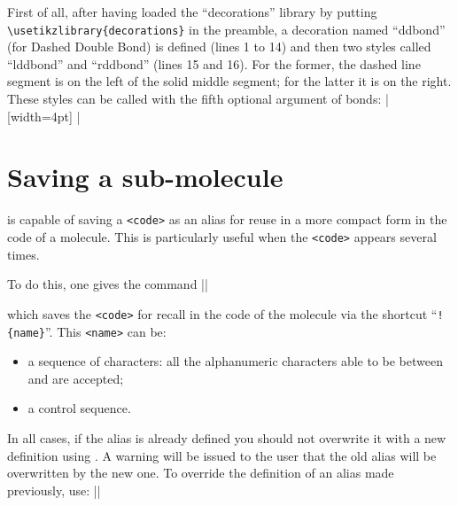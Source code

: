 \documentclass[10pt]{article}
\begin{document}
First of all, after having loaded the ``decorations'' library by putting \verb-\usetikzlibrary{decorations}- in the preamble, a decoration named ``ddbond'' (for Dashed Double Bond) is defined (lines 1 to 14) and then two \TIKZ styles called ``lddbond'' and ``rddbond'' (lines 15 and 16). For the former, the dashed line segment is on the left of the solid middle segment; for the latter it is on the right. These styles can be called with the fifth optional argument of bonds:
|
{
  [width=4pt]
  {
    \pgfpathlineto{\pgfpoint{4pt}{0pt}}
    \pgfpathmoveto{\pgfpoint{2pt}{2pt}}
    \pgfpathlineto{\pgfpoint{4pt}{2pt}}
    \pgfpathmoveto{\pgfpoint{4pt}{0pt}}
  }
  {
    \pgfpathlineto{\pgfpointdecoratedpathlast}
  }
}
\setatomsep{4em}
|

\section{Saving a sub-molecule}\label{definesubmol}
\CF is capable of saving a \verb-<code>- as an alias for reuse in a more compact form in the code of a molecule. This is particularly useful when the \verb-<code>- appears several times.

To do this, one gives the command
\centerverb||
\smallskip

which saves the \verb/<code>/ for recall in the code of the molecule via the shortcut ``\verb/!{name}/''. This \verb-<name>- can be:
\begin{itemize}
	\item a sequence of characters: all the alphanumeric characters able to be between \texttt{\string\csname} and \texttt{\string\endcsname} are accepted;
	\item a control sequence.
\end{itemize}

In all cases, if the alias is already defined you should not overwrite it with a new definition using . A warning will be issued to the user that the old alias will be overwritten by the new one. To override the definition of an alias made previously, use:\label{redefinesubmol}
\centerverb||\idx*{\redefinesubmol}
\smallskip
\end{document}
